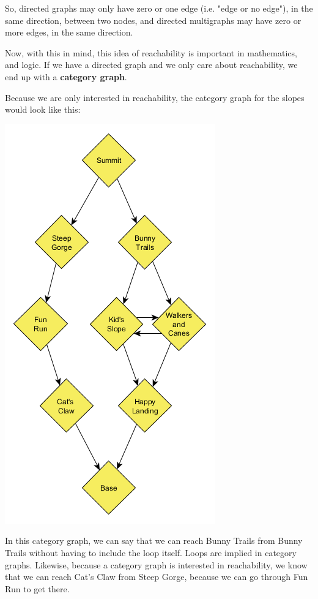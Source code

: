 So, directed graphs may only have zero or one edge (i.e. "edge or no edge"), in the same direction, between two nodes, and directed multigraphs may have zero or more edges, in the same direction.

Now, with this in mind, this idea of reachability is important in mathematics, and logic. If we have a directed graph and we only care about reachability, we end up with a \textbf{category graph}.

Because we are only interested in reachability, the category graph for the slopes would look like this:

\includegraphics{01/slopes3.png}

In this category graph, we can say that we can reach Bunny Trails from Bunny Trails without having to include the loop itself. Loops are implied in category graphs. Likewise, because a category graph is interested in reachability, we know that we can reach Cat's Claw from Steep Gorge, because we can go through Fun Run to get there.

